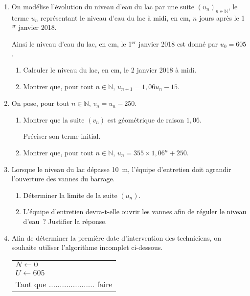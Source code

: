 \begin{enumerate}
     \item On modélise l'évolution du niveau d'eau du lac par une suite $(u_n)_{n\in \mathbb{N}}$, le terme $u_n$ représentant le niveau d'eau du lac à midi, en cm, $n$ jours après le 1${^\text{er}}$ janvier 2018.
     \par
     Ainsi le niveau d'eau du lac, en cm, le 1${^\text{er}}$ janvier 2018 est donné par $u_0=605$.
     \begin{enumerate}[label=\alph*.]
          \item Calculer le niveau du lac, en cm, le 2 janvier 2018 à midi.
          \item Montrer que, pour tout $n\in\mathbb{N}$, $u_{n+1}=1,06 u_n - 15$.
     \end{enumerate}
     \item On pose, pour tout $n\in \mathbb{N}$, $v_n=u_n-250$.
     \begin{enumerate}[label=\alph*.]
          \item Montrer que la suite $(v_n)$ est géométrique de raison $1,06$.
          \par
          Préciser son terme initial.
          \item Montrer que, pour tout $n\in\mathbb{N}$, $u_n=355\times 1,06^{n}+250$.
     \end{enumerate}
     \item Lorsque le niveau du lac dépasse 10~m, l'équipe d'entretien doit agrandir l'ouverture des vannes du barrage.
     \begin{enumerate}[label=\alph*.]
          \item Déterminer la limite de la suite $(u_n)$.
          \item L'équipe d'entretien devra-t-elle ouvrir les vannes afin de réguler le niveau d'eau~? Justifier la réponse.
     \end{enumerate}
     \item Afin de déterminer la première date d'intervention des techniciens, on souhaite utiliser l'algorithme incomplet ci-dessous.
     \begin{center}
\begin{extern}%
               \renewcommand{\arraystretch}{1.2}
          \begin{tabular}{|p{5cm}|}
               \hline
               $N \leftarrow 0$\\
               $U \leftarrow 605$\\
               Tant que ..................... faire\\

\end{tabular}
\end{extern}
\end{center}
\end{enumerate}
